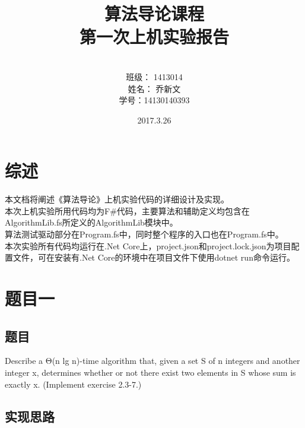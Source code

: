 \documentclass[a4paper]{article}
\begin{document}
\title{\Huge 算法导论课程\\ 第一次上机实验报告}
\author { \vspace{12cm} \\ \LARGE 班级：  1413014  \\ \LARGE 姓名：  乔新文   \\ \LARGE 学号：14130140393} 
\date{ \vspace{4cm} 2017.3.26}

\maketitle
\clearpage

\tableofcontents

\clearpage

\section{综述}

本文档将阐述《算法导论》上机实验代码的详细设计及实现。\\

本次上机实验所用代码均为F\#代码，主要算法和辅助定义均包含在AlgorithmLib.fs所定义的AlgorithmLib模块中。\\

算法测试驱动部分在Program.fs中，同时整个程序的入口也在Program.fs中。\\

本次实验所有代码均运行在.Net Core上，project.json和project.lock.json为项目配置文件，可在安装有.Net Core的环境中在项目文件下使用dotnet run命令运行。\\

\section{题目一}

\subsection{题目}

Describe a Θ(n lg n)-time algorithm that, given a set S of n integers and another integer x, determines whether or not there exist two elements in S whose sum is exactly x. (Implement exercise 2.3-7.)

\subsection{实现思路}
\end{document}
